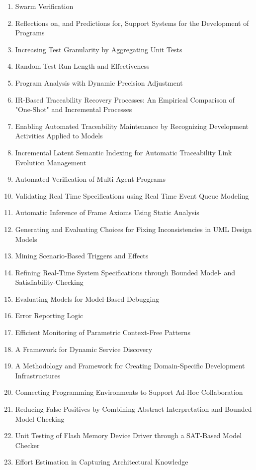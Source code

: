 \begin{enumerate}[itemsep=-1ex]
  \item Swarm Verification
  \item Reflections on, and Predictions for, Support Systems for the Development of Programs
  \item Increasing Test Granularity by Aggregating Unit Tests
  \item Random Test Run Length and Effectiveness
  \item Program Analysis with Dynamic Precision Adjustment
  \item IR-Based Traceability Recovery Processes: An Empirical Comparison of "One-Shot" and Incremental Processes
  \item Enabling Automated Traceability Maintenance by Recognizing Development Activities Applied to Models
  \item Incremental Latent Semantic Indexing for Automatic Traceability Link Evolution Management
  \item Automated Verification of Multi-Agent Programs
  \item Validating Real Time Specifications using Real Time Event Queue Modeling
  \item Automatic Inference of Frame Axioms Using Static Analysis
  \item Generating and Evaluating Choices for Fixing Inconsistencies in UML Design Models
  \item Mining Scenario-Based Triggers and Effects
  \item Refining Real-Time System Specifications through Bounded Model- and Satisfiability-Checking
  \item Evaluating Models for Model-Based Debugging
  \item Error Reporting Logic
  \item Efficient Monitoring of Parametric Context-Free Patterns
  \item A Framework for Dynamic Service Discovery
  \item A Methodology and Framework for Creating Domain-Specific Development Infrastructures
  \item Connecting Programming Environments to Support Ad-Hoc Collaboration
  \item Reducing False Positives by Combining Abstract Interpretation and Bounded Model Checking
  \item Unit Testing of Flash Memory Device Driver through a SAT-Based Model Checker
  \item Effort Estimation in Capturing Architectural Knowledge

\end{enumerate}
